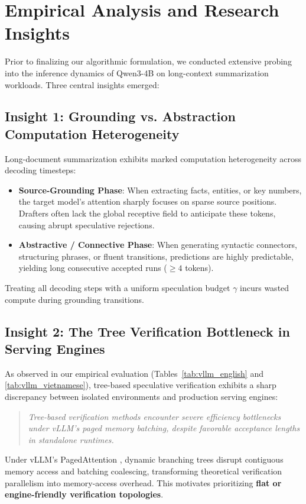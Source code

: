 \documentclass[11pt]{article}
\begin{document}
\section{Empirical Analysis and Research Insights}
\label{sec:insights}

Prior to finalizing our algorithmic formulation, we conducted extensive probing into the inference dynamics of Qwen3-4B on long-context summarization workloads. Three central insights emerged:

\subsection{Insight 1: Grounding vs. Abstraction Computation Heterogeneity}
Long-document summarization exhibits marked computation heterogeneity across decoding timesteps:
\begin{itemize}
    \item \textbf{Source-Grounding Phase}: When extracting facts, entities, or key numbers, the target model's attention sharply focuses on sparse source positions. Drafters often lack the global receptive field to anticipate these tokens, causing abrupt speculative rejections.
    \item \textbf{Abstractive / Connective Phase}: When generating syntactic connectors, structuring phrases, or fluent transitions, predictions are highly predictable, yielding long consecutive accepted runs ($\ge 4$ tokens).
\end{itemize}
Treating all decoding steps with a uniform speculation budget $\gamma$ incurs wasted compute during grounding transitions.

\subsection{Insight 2: The Tree Verification Bottleneck in Serving Engines}
As observed in our empirical evaluation (Tables~\ref{tab:vllm_english} and \ref{tab:vllm_vietnamese}), tree-based speculative verification exhibits a sharp discrepancy between isolated environments and production serving engines:
\begin{quote}
    \textit{Tree-based verification methods encounter severe efficiency bottlenecks under vLLM's paged memory batching, despite favorable acceptance lengths in standalone runtimes.}
\end{quote}
Under vLLM's PagedAttention \citep{kwon2023efficient}, dynamic branching trees disrupt contiguous memory access and batching coalescing, transforming theoretical verification parallelism into memory-access overhead. This motivates prioritizing \textbf{flat or engine-friendly verification topologies}.
\end{document}
